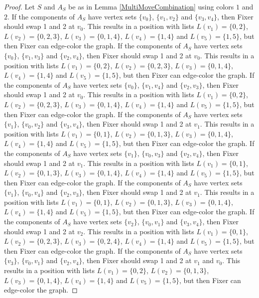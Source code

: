 \documentclass[12pt]{amsart}
\theoremstyle{plain}
\theoremstyle{definition}
\theoremstyle{remark}
\begin{document}
\begin{proof}
Let $S$ and $A_S$ be as in Lemma \ref{MultiMoveCombination} using colors $1$ and $2$. If the components of $A_S$ have vertex sets $\{v_0\}$, $\{v_1, v_2\}$ and $\{v_3, v_4\}$, then Fixer should swap 1 and 2 at $v_0$. This results in a position with lists $L(v_1) = \{0, 2\}$, $L(v_2) = \{0, 2, 3\}$, $L(v_3) = \{0, 1, 4\}$, $L(v_4) = \{1, 4\}$ and $L(v_5) = \{1, 5\}$, but then Fixer can edge-color the graph.
If the components of $A_S$ have vertex sets $\{v_0\}$, $\{v_1, v_3\}$ and $\{v_2, v_4\}$, then Fixer should swap 1 and 2 at $v_0$. This results in a position with lists $L(v_1) = \{0, 2\}$, $L(v_2) = \{0, 2, 3\}$, $L(v_3) = \{0, 1, 4\}$, $L(v_4) = \{1, 4\}$ and $L(v_5) = \{1, 5\}$, but then Fixer can edge-color the graph.
If the components of $A_S$ have vertex sets $\{v_0\}$, $\{v_1, v_4\}$ and $\{v_2, v_3\}$, then Fixer should swap 1 and 2 at $v_0$. This results in a position with lists $L(v_1) = \{0, 2\}$, $L(v_2) = \{0, 2, 3\}$, $L(v_3) = \{0, 1, 4\}$, $L(v_4) = \{1, 4\}$ and $L(v_5) = \{1, 5\}$, but then Fixer can edge-color the graph.
If the components of $A_S$ have vertex sets $\{v_1\}$, $\{v_0, v_2\}$ and $\{v_3, v_4\}$, then Fixer should swap 1 and 2 at $v_1$. This results in a position with lists $L(v_1) = \{0, 1\}$, $L(v_2) = \{0, 1, 3\}$, $L(v_3) = \{0, 1, 4\}$, $L(v_4) = \{1, 4\}$ and $L(v_5) = \{1, 5\}$, but then Fixer can edge-color the graph.
If the components of $A_S$ have vertex sets $\{v_1\}$, $\{v_0, v_3\}$ and $\{v_2, v_4\}$, then Fixer should swap 1 and 2 at $v_1$. This results in a position with lists $L(v_1) = \{0, 1\}$, $L(v_2) = \{0, 1, 3\}$, $L(v_3) = \{0, 1, 4\}$, $L(v_4) = \{1, 4\}$ and $L(v_5) = \{1, 5\}$, but then Fixer can edge-color the graph.
If the components of $A_S$ have vertex sets $\{v_1\}$, $\{v_0, v_4\}$ and $\{v_2, v_3\}$, then Fixer should swap 1 and 2 at $v_1$. This results in a position with lists $L(v_1) = \{0, 1\}$, $L(v_2) = \{0, 1, 3\}$, $L(v_3) = \{0, 1, 4\}$, $L(v_4) = \{1, 4\}$ and $L(v_5) = \{1, 5\}$, but then Fixer can edge-color the graph.
If the components of $A_S$ have vertex sets $\{v_2\}$, $\{v_0, v_1\}$ and $\{v_3, v_4\}$, then Fixer should swap 1 and 2 at $v_2$. This results in a position with lists $L(v_1) = \{0, 1\}$, $L(v_2) = \{0, 2, 3\}$, $L(v_3) = \{0, 2, 4\}$, $L(v_4) = \{1, 4\}$ and $L(v_5) = \{1, 5\}$, but then Fixer can edge-color the graph.
If the components of $A_S$ have vertex sets $\{v_3\}$, $\{v_0, v_1\}$ and $\{v_2, v_4\}$, then Fixer should swap 1 and 2 at $v_1$ and $v_0$. This results in a position with lists $L(v_1) = \{0, 2\}$, $L(v_2) = \{0, 1, 3\}$, $L(v_3) = \{0, 1, 4\}$, $L(v_4) = \{1, 4\}$ and $L(v_5) = \{1, 5\}$, but then Fixer can edge-color the graph.

\end{proof}
\end{document}
